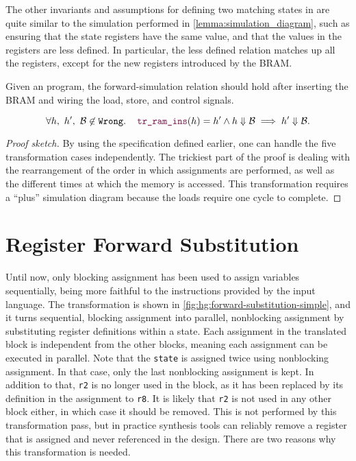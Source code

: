 The other invariants and assumptions for defining two matching states in \htl{}
are quite similar to the simulation performed in
\cref{lemma:simulation_diagram}, such as ensuring that the state registers have
the same value, and that the values in the registers are less defined.  In
particular, the less defined relation matches up all the registers, except for
the new registers introduced by the \gls{BRAM}.

\begin{lemma}\label{lemma:htl_ram}
  Given an \htl{} program, the forward-simulation relation should hold after
  inserting the \gls{BRAM} and wiring the load, store, and control signals.

  {\normalfont\begin{equation}
    \forall h,\ h',\ \mathcal{B} \not\in \texttt{Wrong}\ldotp\quad \yhfunction{tr\_ram\_ins}(h) = h' \land h \Downarrow \mathcal{B} \implies h' \Downarrow \mathcal{B}.
  \end{equation}}

  \begin{proof}[Proof sketch]
    By using the specification defined earlier, one can handle the five
    transformation cases independently.  The trickiest part of the proof is
    dealing with the rearrangement of the order in which assignments are
    performed, as well as the different times at which the memory is accessed.
    This transformation requires a \enquote{plus} simulation diagram because the
    loads require one cycle to complete.
  \end{proof}
\end{lemma}

\section{Register Forward Substitution}%
\label{sec:hg:register-forward-substitution}

Until now, only blocking assignment has been used to assign variables
sequentially, being more faithful to the instructions provided by the input
language.  The transformation is shown in
\cref{fig:hg:forward-substitution-simple}, and it turns sequential, blocking
assignment into parallel, nonblocking assignment by substituting register
definitions within a state.  Each assignment in the translated block is
independent from the other blocks, meaning each assignment can be executed in
parallel.  Note that the \texttt{state} is assigned twice using nonblocking
assignment.  In that case, only the last nonblocking assignment is kept.  In
addition to that, \texttt{r2} is no longer used in the block, as it has been
replaced by its definition in the assignment to \texttt{r8}.  It is likely that
\texttt{r2} is not used in any other block either, in which case it should be
removed.  This is not performed by this transformation pass, but in practice
synthesis tools can reliably remove a register that is assigned and never
referenced in the design.  There are two reasons why this transformation is
needed.

